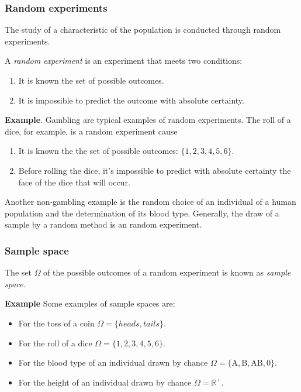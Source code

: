 \begin{frame}
\frametitle{Random experiments}
The study of a characteristic of the population is conducted through random experiments. 

\begin{definition} A \emph{random experiment} is an experiment that meets two conditions:
\begin{enumerate}
\item It is known the set of possible outcomes. 
\item It is impossible to predict the outcome with absolute certainty.
\end{enumerate} 
\end{definition}

\textbf{Example}. Gambling are typical examples of random experiments. 
The roll of a dice, for example, is a random experiment cause
\begin{enumerate}
\item It is known the the set of possible outcomes: $\{1,2,3,4,5,6\}$.
\item Before rolling the dice, it's impossible to predict with absolute certainty the face of the dice that will occur. 
\end{enumerate}

Another non-gambling example is the random choice of an individual of a human population and the determination of its
blood type. 
Generally, the draw of a sample by a random method  is an random experiment.
\end{frame}


\begin{frame}
\frametitle{Sample space}
\begin{definition}
The set $\Omega$ of the possible outcomes of a random experiment is known as \emph{sample space}.
\end{definition}

\textbf{Example} Some examples of sample spaces are:
\begin{itemize}
\item For the toss of a coin $\Omega=\{heads,tails\}$.
\item For the roll of a dice $\Omega=\{1,2,3,4,5,6\}$.
\item For the blood type of an individual drawn by chance $\Omega=\{\mbox{A},\mbox{B},\mbox{AB},\mbox{0}\}$.
\item For the height of an individual drawn by chance $\Omega=\mathbb{R}^+$.
\end{itemize}
\end{frame}


